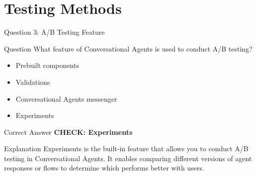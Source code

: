 \documentclass[aspectratio=169]{beamer}
\begin{document}
\section{Testing Methods}

\begin{frame}{Question 3: A/B Testing Feature}
  \begin{block}{Question}
    What feature of Conversational Agents is used to conduct A/B testing?
  \end{block}
  
  
  
  \begin{itemize}
    \item Prebuilt components
    \item Validations
    \item Conversational Agents messenger
    \item Experiments
  \end{itemize}
  
  
  
  \begin{alertblock}{Correct Answer}
    \textcolor{GoogleGreen}{\textbf{CHECK: Experiments}}
  \end{alertblock}
  
  \vspace{0.2cm}
  
  \begin{block}{Explanation}
    \small
    Experiments is the built-in feature that allows you to conduct A/B testing in Conversational Agents. It enables comparing different versions of agent responses or flows to determine which performs better with users.
  \end{block}
\end{frame}
\end{document}
